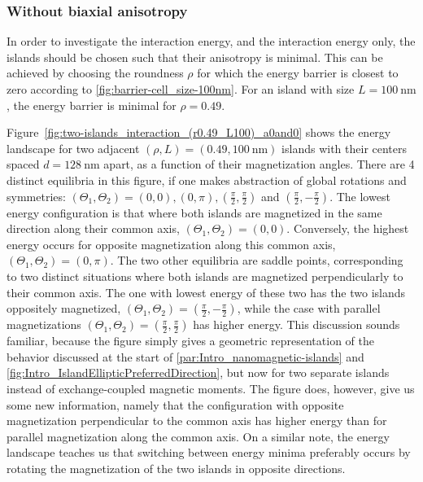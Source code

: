 \documentclass[11pt,a4paper,english]{article}
\begin{document}
\subsubsection{Without biaxial anisotropy}
In order to investigate the interaction energy, and the interaction energy only, the islands should be chosen such that their anisotropy is minimal. This can be achieved by choosing the roundness $\rho$ for which the energy barrier is closest to zero according to \cref{fig:barrier-cell_size-100nm}. For an island with size $L=\SI{100}{\nano\metre}$, the energy barrier is minimal for $\rho=0.49$. \par
Figure~\ref{fig:two-islands_interaction_(r0.49_L100)_a0and0} shows the energy landscape for two adjacent $(\rho, L)=(0.49, \SI{100}{\nano\metre})$ islands with their centers spaced $d=\SI{128}{\nano\metre}$ apart, as a function of their magnetization angles. There are 4 distinct equilibria in this figure, if one makes abstraction of global rotations and symmetries: $(\Theta_1, \Theta_2) = (0,0), (0, \pi), (\frac{\pi}{2}, \frac{\pi}{2})$ and $(\frac{\pi}{2}, -\frac{\pi}{2})$. The lowest energy configuration is that where both islands are magnetized in the same direction along their common axis, $(\Theta_1, \Theta_2) = (0,0)$. Conversely, the highest energy occurs for opposite magnetization along this common axis, $(\Theta_1, \Theta_2) = (0,\pi)$. The two other equilibria are saddle points, corresponding to two distinct situations where both islands are magnetized perpendicularly to their common axis. The one with lowest energy of these two has the two islands oppositely magnetized, $(\Theta_1, \Theta_2) = (\frac{\pi}{2}, -\frac{\pi}{2})$, while the case with parallel magnetizations $(\Theta_1, \Theta_2) = (\frac{\pi}{2}, \frac{\pi}{2})$ has higher energy. This discussion sounds familiar, because the figure simply gives a geometric representation of the behavior discussed at the start of \cref{par:Intro_nanomagnetic-islands} and \cref{fig:Intro_IslandEllipticPreferredDirection}, but now for two separate islands instead of exchange-coupled magnetic moments. The figure does, however, give us some new information, namely that the configuration with opposite magnetization perpendicular to the common axis has higher energy than for parallel magnetization along the common axis. On a similar note, the energy landscape teaches us that switching between energy minima preferably occurs by rotating the magnetization of the two islands in opposite directions.
\end{document}
